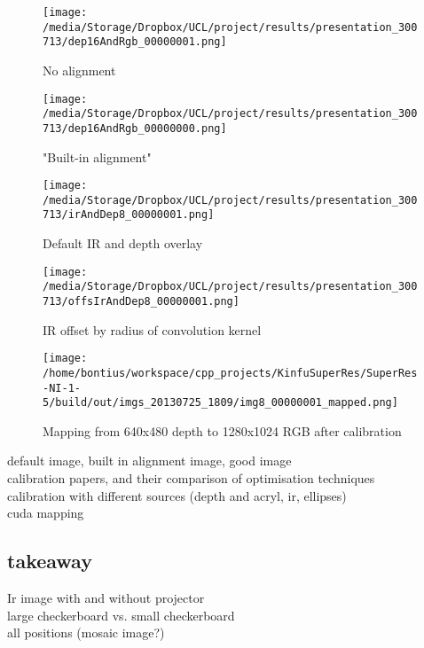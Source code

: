 \documentclass{ucl_thesis}
\begin{document}
\begin{figure}[h!]\centering
	\begin{minipage}[b]{0.49\linewidth}
		\texttt{[image: /media/Storage/Dropbox/UCL/project/results/presentation\_300713/dep16AndRgb\_00000001.png]}
		\caption{No alignment}
	\end{minipage}
	\begin{minipage}[b]{0.49\linewidth}
		\texttt{[image: /media/Storage/Dropbox/UCL/project/results/presentation\_300713/dep16AndRgb\_00000000.png]}
		\caption{"Built-in alignment"}
	\end{minipage}
\end{figure}


\begin{figure}[h!]\centering
    \begin{minipage}[b]{0.49\linewidth} \label{fig:ir}
        \texttt{[image: /media/Storage/Dropbox/UCL/project/results/presentation\_300713/irAndDep8\_00000001.png]}
        \caption{Default IR and depth overlay}
    \end{minipage}
    \begin{minipage}[b]{0.49\linewidth}
        \texttt{[image: /media/Storage/Dropbox/UCL/project/results/presentation\_300713/offsIrAndDep8\_00000001.png]}
        \caption{IR offset by radius of convolution kernel}
    \end{minipage}
\end{figure}

\begin{figure}[h!]\centering
        \texttt{[image: /home/bontius/workspace/cpp\_projects/KinfuSuperRes/SuperRes-NI-1-5/build/out/imgs\_20130725\_1809/img8\_00000001\_mapped.png]}
        \caption{Mapping from 640x480 depth to 1280x1024 RGB after calibration}
\end{figure}


default image, built in alignment image, good image\\
calibration papers, and their comparison of optimisation techniques\\
calibration with different sources (depth and acryl, ir, ellipses)\\
cuda mapping\\


\subsection{takeaway}
Ir image with and without projector\\
large checkerboard vs. small checkerboard\\
all positions (mosaic image?)\\
\end{document}

